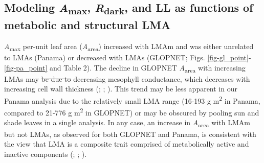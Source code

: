 \documentclass[
  12pt,
  letterpaper,
  DIV=11,
  numbers=noendperiod]{scrartcl}
\providecommand{\DIFadd}[1]{{\protect\color{blue}\uwave{#1}}} %
\providecommand{\DIFdel}[1]{{\protect\color{red}\sout{#1}}}                      %
\providecommand{\DIFaddbegin}{} %
\providecommand{\DIFaddend}{} %
\providecommand{\DIFdelbegin}{} %
\providecommand{\DIFdelend}{} %
\newcommand{\DIFscaledelfig}{0.5}
\newlength{\DIFdelgraphicswidth} %
\newlength{\DIFdelgraphicsheight} %
\newcommand{\DIFaddincludegraphics}[2][]{{\color{blue}\fbox{\DIFOincludegraphics[#1]{#2}}}} %
\newcommand{\DIFdelincludegraphics}[2][]{%
\sbox{\DIFdelgraphicsbox}{\DIFOincludegraphics[#1]{#2}}%
\settoboxwidth{\DIFdelgraphicswidth}{\DIFdelgraphicsbox} %
\settoboxtotalheight{\DIFdelgraphicsheight}{\DIFdelgraphicsbox} %
\scalebox{\DIFscaledelfig}{%
\parbox[b]{\DIFdelgraphicswidth}{\usebox{\DIFdelgraphicsbox}\\[-\baselineskip] \rule{\DIFdelgraphicswidth}{0em}}\llap{\resizebox{\DIFdelgraphicswidth}{\DIFdelgraphicsheight}{%
\setlength{\unitlength}{\DIFdelgraphicswidth}%
\begin{picture}(1,1)%
\thicklines\linethickness{2pt} %
{\color[rgb]{1,0,0}\put(0,0){\framebox(1,1){}}}%
{\color[rgb]{1,0,0}\put(0,0){\line( 1,1){1}}}%
{\color[rgb]{1,0,0}\put(0,1){\line(1,-1){1}}}%
\end{picture}%
}\hspace*{3pt}}} %
} %
\DeclareRobustCommand{\DIFaddbegin}{\DIFOaddbegin \let\includegraphics\DIFaddincludegraphics} %
\DeclareRobustCommand{\DIFaddend}{\DIFOaddend \let\includegraphics\DIFOincludegraphics} %
\DeclareRobustCommand{\DIFdelbegin}{\DIFOdelbegin \let\includegraphics\DIFdelincludegraphics} %
\DeclareRobustCommand{\DIFdelend}{\DIFOaddend \let\includegraphics\DIFOincludegraphics} %
\begin{document}
\subsection{\texorpdfstring{Modeling \emph{A}\textsubscript{max},
\emph{R}\textsubscript{dark}, and LL as functions of metabolic and
structural
LMA}{Modeling Amax, Rdark, and LL as functions of metabolic and structural LMA}}\label{modeling-amax-rdark-and-ll-as-functions-of-metabolic-and-structural-lma}

\emph{A}\textsubscript{max} per-unit leaf area
(\emph{A}\textsubscript{area}) increased with LMAm and was either
unrelated to LMAs (Panama) or decreased with LMAs (GLOPNET; Figs.
\ref{fig-gl_point}-\ref{fig-pa_point} and Table 2). The decline in
GLOPNET \emph{A}\textsubscript{area} with increasing LMAs may \DIFdelbegin \DIFdel{be due to
}\DIFdelend \DIFaddbegin \DIFadd{reflect
}\DIFaddend decreasing mesophyll conductance, which decreases with increasing cell
wall thickness (;
;
). This trend may be less
apparent in our Panama analysis due to the relatively small LMA range
(16-193 g m\textsuperscript{2} in Panama, compared to 21-776 g
m\textsuperscript{2} in GLOPNET) or may be obscured by pooling sun and
shade leaves in a single analysis. In any case, an increase in
\emph{A}\textsubscript{area} with LMAm but not LMAs, as observed for
both GLOPNET and Panama, is consistent with the view that LMA is a
composite trait comprised of metabolically active and inactive
components (;
;
).
\end{document}
